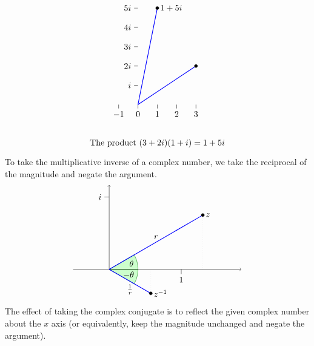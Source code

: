 \begin{equation*}
\begin{tikzpicture}[scale=0.8]
\begin{scope}[xshift=14cm]
      \draw(0,1) -- +(-0.2,0) node[left] {$i$};
      \draw(0,2) -- +(-0.2,0) node[left] {$2i$};
      \draw(0,3) -- +(-0.2,0) node[left] {$3i$};
      \draw(0,4) -- +(-0.2,0) node[left] {$4i$};
      \draw(0,5) -- +(-0.2,0) node[left] {$5i$};
      \draw(-1,0) -- +(0,-0.2) node[below] {$-1$};
      \draw(0,0) -- +(0,-0.2) node[below] {$0$};
      \draw(1,0) -- +(0,-0.2) node[below] {$1$};
      \draw(2,0) -- +(0,-0.2) node[below] {$2$};
      \draw(3,0) -- +(0,-0.2) node[below] {$3$};
      \draw[thick, blue] (0,0) -- (3,2);
      \draw[fill, black] (3,2) circle [radius=2.25pt];
      \draw[thick, blue] (0,0) -- (1,5);
      \draw[fill, black] (1,5) circle [radius=2.25pt] node [right] {$1+5i$};
      \draw (1,-2) node {The product $(3+2i)(1+i)=1+5i$};
    \end{scope}
  \end{tikzpicture}
\end{equation*}
To take the multiplicative inverse of a complex number, we take the
reciprocal of the magnitude and negate the argument. 
\begin{equation*}
  \begin{tikzpicture}
    \draw[help lines, dotted] (30:4.5) -- (30:4.5 |- 0,0);
    \draw[help lines, dotted] (-30:2) -- (-30:2 |- 0,0);
    \filldraw[fill=green!20,draw=green!50!black] (0,0) -- (1.2,0) arc (0:30:1.2) -- cycle;
    \filldraw[fill=green!20,draw=green!50!black] (0,0) -- (1.2,0) arc (0:-30:1.2) -- cycle;
    \node at (15:9mm){$~\theta$};
    \node at (-15:9mm){$-\theta~$};
    \draw[->](-1.5,0) -- (5.5,0);
    \draw[->](0,0) -- (0,3.5);
    \draw(0,3) -- +(-0.2,0) node[left] {$i$};
    \draw(3,0) -- +(0,-0.2) node[below] {$1$};
    \draw[thick, blue] (0,0) -- node[above, black] {$r$} (30:4.5);
    \draw[fill, black] (30:4.5) circle [radius=1.8pt] node [right] {$z$};
    \draw[thick, blue] (0,0) -- node[below, black] {$\frac{1}{r}$} (-30:2);
    \draw[fill, black] (-30:2) circle [radius=1.8pt] node [right] {$z^{-1}$};
  \end{tikzpicture}
\end{equation*}
The effect of taking the complex conjugate is to reflect the given
complex number about the $x$ axis (or equivalently, keep the magnitude
unchanged and negate the argument).
